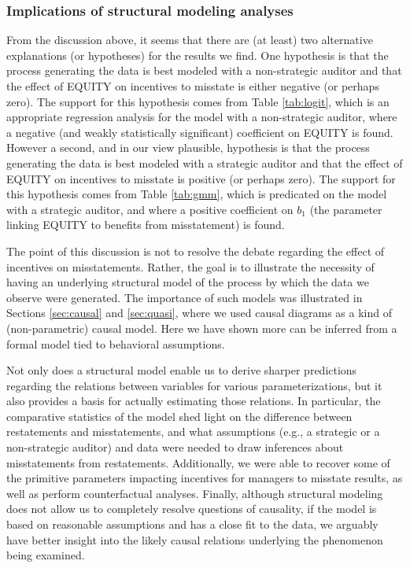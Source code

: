 \subsubsection{Implications of structural modeling analyses}
From the discussion above, it seems that there are (at least) two alternative explanations (or hypotheses) for the results we find.
One hypothesis is that the process generating the data is best modeled with a non-strategic auditor and that the effect of EQUITY on incentives to misstate is either negative (or perhaps zero).
The support for this hypothesis comes from Table \ref{tab:logit}, which is an appropriate regression analysis for the model with a non-strategic auditor, where a negative (and weakly statistically significant) coefficient on EQUITY is found.
However a second, and in our view plausible, hypothesis is that the process generating the data is best modeled with a strategic auditor and that the effect of EQUITY on incentives to misstate is positive (or perhaps zero).
The support for this hypothesis comes from Table \ref{tab:gmm}, which is predicated on the model with a strategic auditor, and where a positive coefficient on $b_1$ (the parameter linking EQUITY to benefits from misstatement) is found.

The point of this discussion is not to resolve the debate regarding the effect of incentives on misstatements. 
Rather, the goal is to illustrate the necessity of having an underlying structural model of the process by which the data we observe were generated.
The importance of such models was illustrated in Sections \ref{sec:causal} and \ref{sec:quasi}, where we used causal diagrams as a kind of (non-parametric) causal model.
Here we have shown more can be inferred from a formal model tied to behavioral assumptions.

Not only does a structural model enable us to derive sharper predictions regarding the relations between variables for various parameterizations, but it also provides a basis for actually estimating those relations. 
In particular, the comparative statistics of the model shed light on the difference between restatements and misstatements, and what assumptions (e.g., a strategic or a non-strategic auditor) and data were needed to draw inferences about misstatements from restatements. 
Additionally, we were able to recover some of the primitive parameters impacting incentives for managers to misstate results, as well as perform counterfactual analyses. Finally, although structural modeling does not allow us to completely resolve questions of causality, if the model is based on reasonable assumptions and has a close fit to the data, we arguably have better insight into the likely causal relations underlying the phenomenon being examined. 

